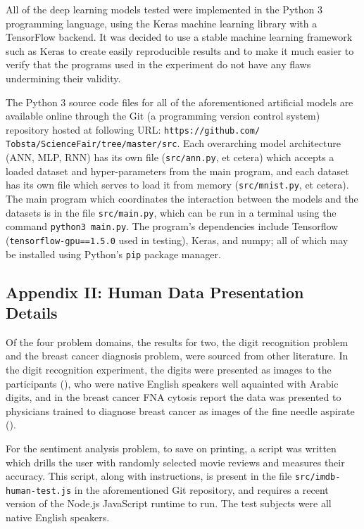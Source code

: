 \documentclass[]{report}
\begin{document}
All of the deep learning models tested were implemented in the Python 3 programming language, using the Keras machine learning library with a TensorFlow backend. It was decided to use a stable machine learning framework such as Keras to create easily reproducible results and to make it much easier to verify that the programs used in the experiment do not have any flaws undermining their validity.

The Python 3 source code files for all of the aforementioned artificial models are available online through the Git (a programming version control system) repository hosted at following URL: \texttt{https://github.com/ Tobsta/ScienceFair/tree/master/src}. Each overarching model architecture (ANN, MLP, RNN) has its own file (\texttt{src/ann.py}, et cetera) which accepts a loaded dataset and hyper-parameters from the main program, and each dataset has its own file which serves to load it from memory (\texttt{src/mnist.py}, et cetera). The main program which coordinates the interaction between the models and the datasets is in the file \texttt{src/main.py}, which can be run in a terminal using the command \texttt{python3 main.py}. The program's dependencies include Tensorflow (\texttt{tensorflow-gpu==1.5.0} used in testing), Keras, and numpy; all of which may be installed using Python's \texttt{pip} package manager.

\label{sec:Appendix_II}
\subsection{Appendix II: Human Data Presentation Details}

Of the four problem domains, the results for two, the digit recognition problem and the breast cancer diagnosis problem, were sourced from other literature. In the digit recognition experiment, the digits were presented as images to the participants (\cite{simard1993efficient}), who were native English speakers well aquainted with Arabic digits, and in the breast cancer FNA cytosis report the data was presented to physicians trained to diagnose breast cancer as images of the fine needle aspirate (\cite{mangasarian1995breast}).

For the sentiment analysis problem, to save on printing, a script was written which drills the user with randomly selected movie reviews and measures their accuracy. This script, along with instructions, is present in the file \texttt{src/imdb-human-test.js} in the aforementioned Git repository, and requires a recent version of the Node.js JavaScript runtime to run. The test subjects were all native English speakers.
\end{document}
